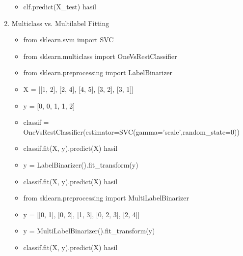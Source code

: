 \begin{enumerate}
\begin{itemize}
\item clf.predict(X\_test) hasil
\end{itemize}
\item Multiclass vs. Multilabel Fitting
\begin{itemize}
\item from sklearn.svm import SVC
\item from sklearn.multiclass import OneVsRestClassifier
\item from sklearn.preprocessing import LabelBinarizer
\item X = [[1, 2], [2, 4], [4, 5], [3, 2], [3, 1]]
\item y = [0, 0, 1, 1, 2]
\item classif = OneVsRestClassifier(estimator=SVC(gamma='scale',random\_state=0))
\item classif.fit(X, y).predict(X) hasil
\item y = LabelBinarizer().fit\_transform(y)
\item classif.fit(X, y).predict(X) hasil
\item from sklearn.preprocessing import MultiLabelBinarizer
\item y = [[0, 1], [0, 2], [1, 3], [0, 2, 3], [2, 4]]
\item y = MultiLabelBinarizer().fit\_transform(y)
\item classif.fit(X, y).predict(X) hasil
\end{itemize}
\end{enumerate}

